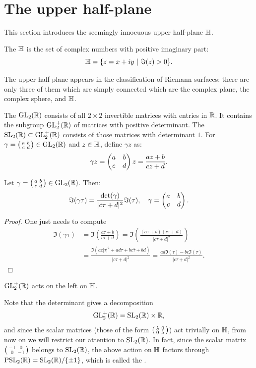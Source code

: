 \section{The upper half-plane}
\label{sec:upper-half-plane}
This section introduces the seemingly innocuous upper half-plane $\mathbb{H}$.
\begin{definition}
  The  $\mathbb{H}$ is the set of complex numbers with positive imaginary part:
\[
\mathbb{H} = \{ z=x+iy ~|~ \Im(z)>0\}.
\]
\end{definition}
The upper half-plane appears in the classification of Riemann surfaces: there are only three of them which are simply connected which are the complex plane, the complex sphere, and $\mathbb{H}$.

The  $\operatorname{GL}_2(\mathbb{R})$ consists of all $2\times 2$ invertible matrices with entries in $\mathbb{R}$. It contains the subgroup $\operatorname{GL}_2^+(\mathbb{R})$ of matrices with positive determinant. The  $\operatorname{SL}_2(\mathbb{R})\subset \operatorname{GL}_2^+(\mathbb{R})$ consists of those matrices with determinant $1$. For $\gamma=\left(\begin{smallmatrix}a&b\\c&d\end{smallmatrix}\right)\in \operatorname{GL}_2(\mathbb{R})$ and $z\in\mathbb{H}$, define $\gamma z$ as:
\begin{equation}
  \label{eq:fractional-linear-transformation}
\gamma z = \left(\begin{matrix}a&b\\c&d\end{matrix}\right) z = \frac{az+b}{cz+d}.
\end{equation}
\begin{lemma}
  Let $\gamma=\left(\begin{smallmatrix}a&b\\c&d\end{smallmatrix}\right)\in\operatorname{GL}_2(\mathbb{R})$. Then:
\[
\Im(\gamma\tau) = \frac{\operatorname{det}(\gamma)}{|c\tau+d|^2}\Im(\tau),\quad \gamma=\left(\begin{matrix}a&b\\c&d\end{matrix}\right).
\]
\end{lemma}

\begin{proof}
  One just needs to compute
\begin{align*}
\Im(\gamma\tau) &= \Im(\frac{a\tau + b}{c\tau+d}) = \Im\left(\frac{(a\tau+b)(c\bar\tau + d)}{|c\tau+d|^2}\right)\\
&= \frac{\Im(ac|\tau|^2 +ad\tau + bc\bar\tau +bd)}{|c\tau+d|^2}=\frac{ad\Im(\tau) - bc\Im(\tau)}{|c\tau+d|^2}.
\end{align*}

\end{proof}
\begin{corollary}
  $\operatorname{GL}_2^+(\mathbb{R})$ acts on the left on $\mathbb{H}$.
\end{corollary}
Note that the determinant gives a decomposition
\[
\operatorname{GL}_2^+(\mathbb{R}) = \operatorname{SL}_2(\mathbb{R}) \times \mathbb{R},
\]
and since the scalar matrices (those of the form $\left(\begin{smallmatrix}\lambda&0\\0&\lambda\end{smallmatrix}\right)$) act trivially on $\mathbb{H}$, from now on we will restrict our attention to $\operatorname{SL}_2(\mathbb{R})$. In fact, since the scalar matrix $\left(\begin{smallmatrix}-1&0\\0&-1\end{smallmatrix}\right)$ belongs to $\operatorname{SL}_2(\mathbb{R})$, the above action on $\mathbb{H}$ factors through $\operatorname{PSL}_2(\mathbb{R})=\operatorname{SL}_2(\mathbb{R})/\{\pm 1\}$, which is called the .

